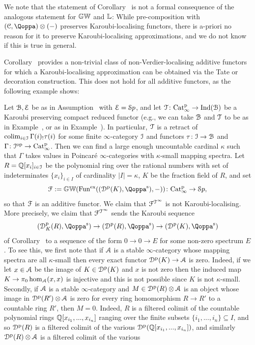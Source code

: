 We note that the statement of Corollary~ is not a formal consequence of the analogous statement for $\mathbb{GW}$ and $\mathbb{L}$:
While pre-composition with $(\C,\QF)\otimes (-)$ preserves Karoubi-localising functors, there is a-priori no reason for it to preserve Karoubi-localising approximations, and we do not know if this is true in general. 

Corollary~ provides a non-trivial class of non-Verdier-localising additive functors for which a Karoubi-localising approximation can be obtained via the Tate or decoration construction. This does not hold for all additive functors, as the following example shows:

\begin{example}
\label{example:not-all-additive}%
Let $\mathcal{B},\mathcal{E}$ be as in Assumption~ with $\mathcal{E} = {\mathcal Sp}$, and let $\mathcal{T}\colon \mathrm{Cat}^{\mathrm p}_\infty \to \operatorname{Ind}(\mathcal{B})$ be a Karoubi preserving compact reduced functor (e.g., we can take $\mathcal{B}$ and $\mathcal{T}$ to be as in Example~, or as in Example~). In particular, $\mathcal{T}$ is a retract of $\mathop{\mathrm{colim}}_{i \in \mathcal{I}}\Gamma(i)_!\tau(i)$ for some finite $\infty$-category $\mathcal{I}$ and functors $\tau\colon \mathcal{I} \to \mathcal{B}$ and $\Gamma\colon \mathcal{I}^\mathrm{op} \to \mathrm{Cat}^{\mathrm p}_\infty$.
Then we can find a large enough uncountable cardinal $\kappa$ such that $\Gamma$ takes values in Poincaré $\infty$-categories with $\kappa$-small mapping spectra.
Let $R = \mathbb{Q}[x_i]_{i \in \mathcal{I}}$ be the polynomial ring over the rational numbers with set of indeterminates $\{x_i\}_{i \in I}$ of cardinality $|I| = \kappa$, $K$ be the fraction field of $R$, and set 
\[
\F := \KGW(\Funx((\Dperf(K),\QF^{\sym}),-))\colon \Catp \to \Spa,
\]
so that $\mathcal{F}$ is an additive functor. 
We claim that $\mathcal{F}^{\mathcal{T}^{\infty}}$ is not Karoubi-localising. More precisely, we claim that $\mathcal{F}^{\mathcal{T}^{\infty}}$ sends the Karoubi sequence
\[
(\Dperf_K(R),\QF^{\sym}) \to (\Dperf(R),\QF^{\sym}) \to (\Dperf(K),\QF^{\sym})
\]
of Corollary~ to a sequence of the form $0 \to 0 \to E$ for some non-zero spectrum $E$. To see this, we first note that if $\mathcal{A}$ is a stable $\infty$-category whose mapping spectra are all $\kappa$-small then every exact functor ${\mathcal D}^{\mathrm{p}}(K) \to \mathcal{A}$ is zero. Indeed, if we let $x \in \mathcal{A}$ be the image of $K \in {\mathcal D}^{\mathrm{p}}(K)$ and $x$ is not zero then the induced map $K \to \pi_0\operatorname{hom}_{\mathcal{A}}(x,x)$ is injective and this is not possible since $K$ is not $\kappa$-small. Secondly, if $\mathcal{A}$ is a stable $\infty$-category and $M \in {\mathcal D}^{\mathrm{p}}(R)\otimes \mathcal{A}$ is an object whose image in ${\mathcal D}^{\mathrm{p}}(R')\otimes \mathcal{A}$ is zero for every ring homomorphism $R \to R'$ to a countable ring $R'$, then $M=0$. Indeed, $R$ is a filtered colimit of the countable polynomial rings $\mathbb{Q}[x_{i_1},...,x_{i_n}]$ ranging over the finite subsets $\{i_1,...,i_n\} \subseteq I$, and so ${\mathcal D}^{\mathrm{p}}(R)$ is a filtered colimit of the various ${\mathcal D}^{\mathrm{p}}(\mathbb{Q}[x_{i_1},...,x_{i_n}])$, and similarly ${\mathcal D}^{\mathrm{p}}(R)\otimes \mathcal{A}$ is a filtered colimit of the various 

\end{example}

